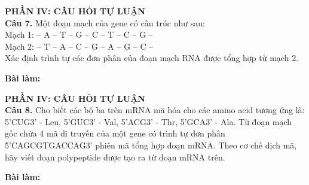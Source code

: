 \documentclass{article}
\begin{document}
\begin{minipage}[t][14.4cm][t]{\linewidth}
\fontsize{23}{31}\selectfont
{\color{brandGreen}\textbf{PHẦN IV: CÂU HỎI TỰ LUẬN}\\[10pt]}
\textbf{Câu 7.} Một đoạn mạch của gene có cấu trúc như sau:\\[6pt]Mạch 1: – A – T – G – C – T – C – G –\\[6pt]Mạch 2: – T – A – C – G – A – G – C –\\[6pt]Xác định trình tự các đơn phân của đoạn mạch RNA được tổng hợp từ mạch 2.
\vspace{14pt}

\textbf{Bài làm:}
\vfill
\end{minipage}
\newpage


\begin{minipage}[t][14.4cm][t]{\linewidth}
\fontsize{23}{31}\selectfont
{\color{brandGreen}\textbf{PHẦN IV: CÂU HỎI TỰ LUẬN}\\[10pt]}
\textbf{Câu 8.} Cho biết các bộ ba trên mRNA mã hóa cho các amino acid tương ứng là: 5'CUG3' - Leu, 5'GUC3' - Val, 5'ACG3' - Thr, 5'GCA3' - Ala. Từ đoạn mạch gốc chứa 4 mã di truyền của một gene có trình tự đơn phân 5'CAGCGTGACCAG3' phiên mã tổng hợp đoạn mRNA. Theo cơ chế dịch mã, hãy viết đoạn polypeptide được tạo ra từ đoạn mRNA trên.
\vspace{14pt}

\textbf{Bài làm:}
\vfill
\end{minipage}
\newpage
\end{document}
